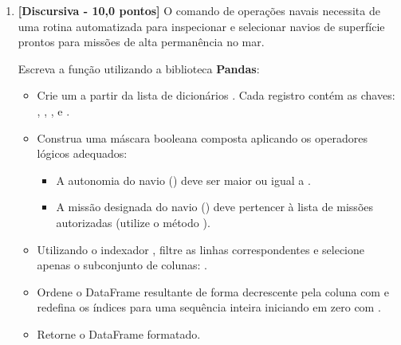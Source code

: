 \begin{enumerate}[label=\textbf{Q\arabic*.}]


\vspace{0.5cm}

\item \textbf{[Discursiva - 10,0 pontos]} O comando de operações navais necessita de uma rotina automatizada para inspecionar e selecionar navios de superfície prontos para missões de alta permanência no mar.

Escreva a função  utilizando a biblioteca \textbf{Pandas}:
\begin{itemize}[leftmargin=*]
    \item Crie um  a partir da lista de dicionários . Cada registro contém as chaves: , , ,  e .
    \item Construa uma máscara booleana composta aplicando os operadores lógicos adequados:
    \begin{itemize}
        \item A autonomia do navio () deve ser maior ou igual a .
        \item A missão designada do navio () deve pertencer à lista de missões autorizadas  (utilize o método ).
    \end{itemize}
    \item Utilizando o indexador , filtre as linhas correspondentes e selecione apenas o subconjunto de colunas: .
    \item Ordene o DataFrame resultante de forma decrescente pela coluna  com  e redefina os índices para uma sequência inteira iniciando em zero com .
    \item Retorne o DataFrame formatado.
\end{itemize}


\end{enumerate}
